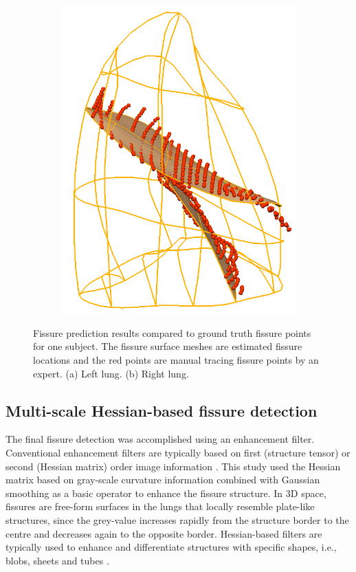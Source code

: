 {\begin{figure}[htbp]
\begin{subfigure}{.37\linewidth}
  \includegraphics[width=\linewidth,trim={{.0\wd0} {.0\wd0} {.0\wd0} {.0\wd0}},clip]{Segmentation/Image/ProjectedRightFissureMesh.png}
  \caption{}
  \label{fig:PCAFissurePrediction-b} 
\end{subfigure}
\caption{Fissure prediction results compared to ground truth fissure points for one subject. The fissure surface meshes are estimated fissure locations and the red points are manual tracing fissure points by an expert. (a) Left lung. (b) Right lung.}
\label{fig:PCAFissurePrediction}
\end{figure}
\subsection{Multi-scale Hessian-based fissure detection}

The final fissure detection was accomplished using an enhancement filter. Conventional enhancement filters are typically based on first (structure tensor) or second (Hessian matrix) order image information \citep{frangi1998multiscale,lorenz1997multi}. This study used the Hessian matrix based on gray-scale curvature information combined with Gaussian smoothing as a basic operator to enhance the fissure structure. In 3D space, fissures are free-form surfaces in the lungs that locally resemble plate-like structures, since the grey-value increases rapidly from the structure border to the centre and decreases again to the opposite border. Hessian-based filters are typically used to enhance and differentiate structures with specific shapes, i.e., blobs, sheets and tubes \citep{frangi1998multiscale,lorenz1997multi}.

}
